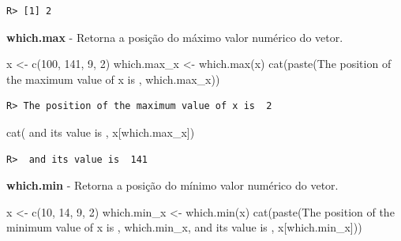 \documentclass[
  11pt,
]{book}
\newenvironment{Shaded}{\begin{snugshade}}{\end{snugshade}}
\newcommand{\DecValTok}[1]{\textcolor[rgb]{0.06,0.06,0.06}{#1}}
\newcommand{\FunctionTok}[1]{\textcolor[rgb]{0,0,0}{#1}}
\newcommand{\NormalTok}[1]{#1}
\newcommand{\OtherTok}[1]{\textcolor[rgb]{0.37,0.37,0.37}{#1}}
\newcommand{\StringTok}[1]{\textcolor[rgb]{0.5,0.5,0.5}{#1}}
\begin{document}
\begin{verbatim}
R> [1] 2
\end{verbatim}

\textbf{which.max} - Retorna a posição do máximo valor numérico do vetor.

\begin{Shaded}
\begin{Highlighting}[]
\NormalTok{x }\OtherTok{\textless{}{-}} \FunctionTok{c}\NormalTok{(}\DecValTok{100}\NormalTok{, }\DecValTok{141}\NormalTok{, }\DecValTok{9}\NormalTok{, }\DecValTok{2}\NormalTok{)}
\NormalTok{which.max\_x }\OtherTok{\textless{}{-}} \FunctionTok{which.max}\NormalTok{(x)}
\FunctionTok{cat}\NormalTok{(}\FunctionTok{paste}\NormalTok{(}\StringTok{\textquotesingle{}The position of the maximum value of x is \textquotesingle{}}\NormalTok{, which.max\_x))}
\end{Highlighting}
\end{Shaded}

\begin{verbatim}
R> The position of the maximum value of x is  2
\end{verbatim}

\begin{Shaded}
\begin{Highlighting}[]
\FunctionTok{cat}\NormalTok{(}\StringTok{\textquotesingle{} and its value is \textquotesingle{}}\NormalTok{, x[which.max\_x])}
\end{Highlighting}
\end{Shaded}

\begin{verbatim}
R>  and its value is  141
\end{verbatim}

\textbf{which.min} - Retorna a posição do mínimo valor numérico do vetor.

\begin{Shaded}
\begin{Highlighting}[]
\NormalTok{x }\OtherTok{\textless{}{-}} \FunctionTok{c}\NormalTok{(}\DecValTok{10}\NormalTok{, }\DecValTok{14}\NormalTok{, }\DecValTok{9}\NormalTok{, }\DecValTok{2}\NormalTok{)}
\NormalTok{which.min\_x }\OtherTok{\textless{}{-}} \FunctionTok{which.min}\NormalTok{(x)}
\FunctionTok{cat}\NormalTok{(}\FunctionTok{paste}\NormalTok{(}\StringTok{\textquotesingle{}The position of the minimum value of x is \textquotesingle{}}\NormalTok{,}
\NormalTok{          which.min\_x, }\StringTok{\textquotesingle{} and its value is \textquotesingle{}}\NormalTok{, x[which.min\_x]))}
\end{Highlighting}
\end{Shaded}
\end{document}
